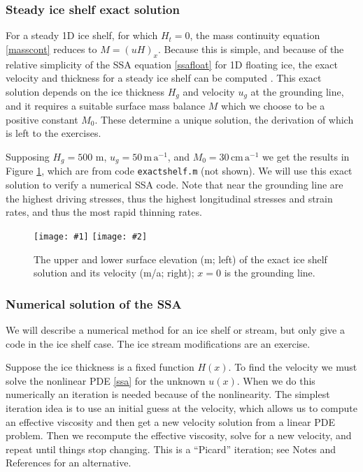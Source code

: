 \documentclass[titlepage,a4paper,final,12pt]{scrartcl}
\newcommand{\twofigsizes}[5]{
\begin{figure}[ht]
\centering
\texttt{[image: \#1]} \quad
\texttt{[image: \#2]}
\caption{#3}
\label{fig:#1}
\end{figure}}
\newcommand{\twofig}[3]{\twofigsizes{#1}{#2}{#3}{2.5in}{2.5in}}
\begin{document}
\subsubsection*{Steady ice shelf exact solution}  For a steady 1D ice shelf, for which $H_t=0$, the mass continuity equation \eqref{masscont} reduces to $M=(uH)_x$.  Because this is simple, and because of the relative simplicity of the SSA equation \eqref{ssafloat} for 1D floating ice, the exact velocity and thickness for a steady ice shelf can be computed \cite{vanderVeen83}.  This exact solution depends on the ice thickness $H_g$ and velocity $u_g$ at the grounding line, and it requires a suitable surface mass balance $M$ which we choose to be a positive constant $M_0$.  These determine a unique solution, the derivation of which is left to the exercises.

Supposing $H_g=500$ m, $u_g = 50 \,\text{m}\,\text{a}^{-1}$, and $M_0=30 \,\text{cm}\,\text{a}^{-1}$ we get the results in Figure \ref{fig:steadyshelfprofile}, which are from code \texttt{exactshelf.m} (not shown).  We will use this exact solution to verify a numerical SSA code.  Note that near the grounding line are the highest driving stresses, thus the highest longitudinal stresses and strain rates, and thus the most rapid thinning rates.

\twofig{steadyshelfprofile}{steadyshelfvelocity}{The upper and lower surface elevation (m; left) of the exact ice shelf solution and its velocity (m/a; right); $x=0$ is the grounding line.}

\subsubsection*{Numerical solution of the SSA}  We will describe a numerical method for an ice shelf or stream, but only give a code in the ice shelf case.  The ice stream modifications are an exercise.

Suppose the ice thickness is a fixed function $H(x)$.  To find the velocity we must solve the nonlinear PDE \eqref{ssa} for the unknown $u(x)$.  When we do this numerically an iteration is needed because of the nonlinearity.  The simplest iteration idea is to use an initial guess at the velocity, which allows us to compute an effective viscosity and then get a new velocity solution from a linear PDE problem.  Then we recompute the effective viscosity, solve for a new velocity, and repeat until things stop changing.  This is a ``Picard'' iteration; see Notes and References for an alternative.
\end{document}
